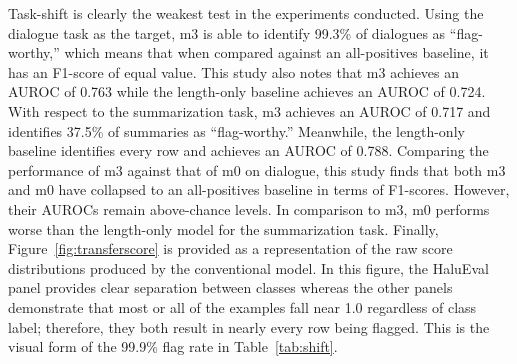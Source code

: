 \documentclass[a4paper,fleqn]{cas-sc}
\begin{document}
Task-shift is clearly the weakest test in the experiments conducted. Using the dialogue task as the target, m3 is able to identify 99.3\% of dialogues as ``flag-worthy,'' which means that when compared against an all-positives baseline, it has an F1-score of equal value. This study also notes that m3 achieves an AUROC of 0.763 while the length-only baseline achieves an AUROC of 0.724. With respect to the summarization task, m3 achieves an AUROC of 0.717 and identifies 37.5\% of summaries as ``flag-worthy.'' Meanwhile, the length-only baseline identifies every row and achieves an AUROC of 0.788. Comparing the performance of m3 against that of m0 on dialogue, this study finds that both m3 and m0 have collapsed to an all-positives baseline in terms of F1-scores. However, their AUROCs remain above-chance levels. In comparison to m3, m0 performs worse than the length-only model for the summarization task. Finally, Figure~\ref{fig:transferscore} is provided as a representation of the raw score distributions produced by the conventional model. In this figure, the HaluEval panel provides clear separation between classes whereas the other panels demonstrate that most or all of the examples fall near 1.0 regardless of class label; therefore, they both result in nearly every row being flagged. This is the visual form of the 99.9\% flag rate in Table~\ref{tab:shift}.
\end{document}
